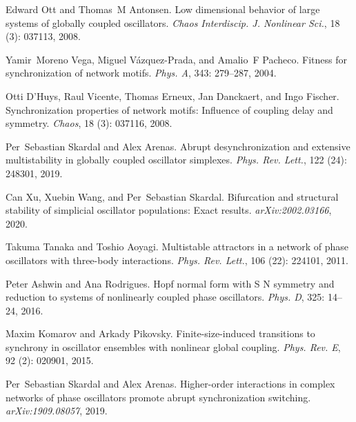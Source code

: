 Edward Ott and Thomas~M Antonsen.
\newblock Low dimensional behavior of large systems of globally coupled
oscillators.
\newblock \emph{Chaos Interdiscip. J. Nonlinear Sci.}, 18
(3): 037113, 2008.

Yamir~Moreno Vega, Miguel {V{\'a}zquez-Prada}, and Amalio~F Pacheco.
\newblock Fitness for synchronization of network motifs.
\newblock \emph{Phys. A}, 343: 279--287, 2004.

Otti D'Huys, Raul Vicente, Thomas Erneux, Jan Danckaert, and Ingo Fischer.
\newblock Synchronization properties of network motifs: {{Influence}} of
coupling delay and symmetry.
\newblock \emph{Chaos}, 18 (3): 037116, 2008.

Per~Sebastian Skardal and Alex Arenas.
\newblock Abrupt desynchronization and extensive multistability in globally
coupled oscillator simplexes.
\newblock \emph{Phys. Rev. Lett.}, 122 (24): 248301,
2019{}.

Can Xu, Xuebin Wang, and Per~Sebastian Skardal.
\newblock Bifurcation and structural stability of simplicial oscillator
populations: {{Exact}} results.
\newblock \emph{arXiv:2002.03166}, 2020.

Takuma Tanaka and Toshio Aoyagi.
\newblock Multistable attractors in a network of phase oscillators with
three-body interactions.
\newblock \emph{Phys. Rev. Lett.}, 106 (22): 224101, 2011.

Peter Ashwin and Ana Rodrigues.
\newblock Hopf normal form with S N symmetry and reduction
to systems of nonlinearly coupled phase oscillators.
\newblock \emph{Phys. D}, 325: 14--24, 2016.

Maxim Komarov and Arkady Pikovsky.
\newblock Finite-size-induced transitions to synchrony in oscillator ensembles
with nonlinear global coupling.
\newblock \emph{Phys. Rev. E}, 92 (2): 020901, 2015.

Per~Sebastian Skardal and Alex Arenas.
\newblock Higher-order interactions in complex networks of phase oscillators
promote abrupt synchronization switching.
\newblock \emph{arXiv:1909.08057}, 2019{}.

